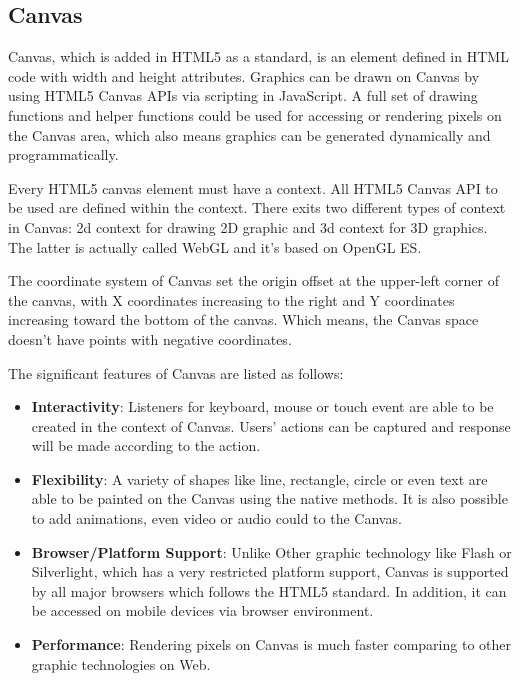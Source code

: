






\subsection{Canvas}

Canvas, which is added in HTML5 as a standard, is an element defined in HTML code with width and height attributes. Graphics can be drawn on Canvas by using HTML5 Canvas APIs via scripting in JavaScript. A full set of drawing functions and helper functions could be used for accessing or rendering pixels on the Canvas area, which also means graphics can be generated dynamically and programmatically. 

Every HTML5 canvas element must have a context. All HTML5 Canvas API to be used are defined within the context. There exits two different types of context in Canvas: 2d context  for drawing 2D graphic and 3d context for 3D graphics. The latter is actually called WebGL and it’s based on OpenGL ES.

The coordinate system of Canvas set the origin offset at the upper-left corner of the canvas, with X coordinates increasing to the right and Y coordinates increasing toward the bottom of the canvas. Which means, the Canvas space doesn’t have points with negative coordinates. 

The significant features of Canvas are listed as follows:

\begin{itemize}
  \item \textbf{Interactivity}: Listeners for keyboard, mouse or touch event are able to be created in the context of Canvas. Users' actions can be captured and response will be made according to the action. 
  \item \textbf{Flexibility}: A variety of shapes like line, rectangle, circle or even text are able to be painted on the Canvas using the native methods. It is also possible to add animations, even video or audio could to the Canvas.
  \item \textbf{Browser/Platform Support}: Unlike Other graphic technology like Flash or Silverlight, which has a very restricted platform support, Canvas is supported by all major browsers which follows the HTML5 standard. In addition, it can be accessed on mobile devices via browser environment.
  \item \textbf{Performance}: Rendering pixels on Canvas is much faster comparing to other graphic technologies on Web\cite{corcoran2011effective}.
\end{itemize}


